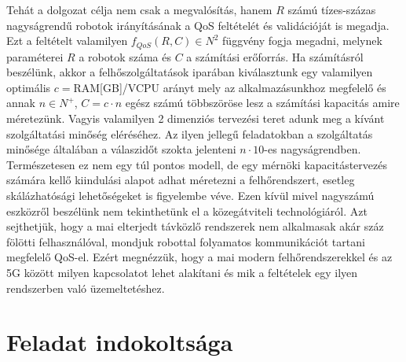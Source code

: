 Tehát a dolgozat célja nem csak a megvalósítás, hanem $R$ számú tízes-százas nagyságrendű robotok irányításának a QoS feltételét és validációját is megadja. Ezt a feltételt valamilyen $f_{QoS}(R,C)\in N^2$ függvény fogja megadni, melynek paraméterei $R$ a robotok száma és $C$ a számítási erőforrás. Ha számításról beszélünk, akkor a felhőszolgáltatások iparában kiválasztunk egy valamilyen optimális $c=$RAM[GB]/VCPU arányt mely az alkalmazásunkhoz megfelelő és annak $n\in N^+$, $C=c\cdot n$ egész számú többszöröse lesz a számítási kapacitás amire méretezünk. Vagyis valamilyen 2 dimenziós tervezési teret adunk meg a kívánt szolgáltatási minőség eléréséhez. Az ilyen jellegű feladatokban a szolgáltatás minősége általában a válaszidőt szokta jelenteni $n \cdot 10$-es nagyságrendben. Természetesen ez nem egy túl pontos modell, de egy mérnöki kapacitástervezés számára kellő kiindulási alapot adhat méretezni a felhőrendszert, esetleg skálázhatósági lehetőségeket is figyelembe véve.
Ezen kívül mivel nagyszámú eszközről beszélünk nem tekinthetünk el a közegátviteli technológiáról. Azt sejthetjük, hogy a mai elterjedt távközlő rendszerek nem alkalmasak akár száz fölötti felhasználóval, mondjuk robottal folyamatos kommunikációt tartani megfelelő QoS-el. Ezért megnézzük, hogy a mai modern felhőrendszerekkel és az 5G között milyen kapcsolatot lehet alakítani és mik a feltételek egy ilyen rendszerben való üzemeltetéshez.

\section{Feladat indokoltsága}
